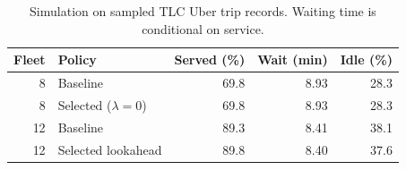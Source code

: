 \begin{table}[htbp]
\centering
\small
\caption{Simulation on sampled TLC Uber trip records. Waiting time is conditional on service.}
\label{tab:dispatch_results}
\begin{tabular}{rlrrr}
\hline
Fleet & Policy & Served (\%) & Wait (min) & Idle (\%) \\
\hline
8 & Baseline & 69.8 & 8.93 & 28.3 \\
8 & Selected ($\lambda=0$) & 69.8 & 8.93 & 28.3 \\
12 & Baseline & 89.3 & 8.41 & 38.1 \\
12 & Selected lookahead & 89.8 & 8.40 & 37.6 \\
\hline
\end{tabular}
\end{table}